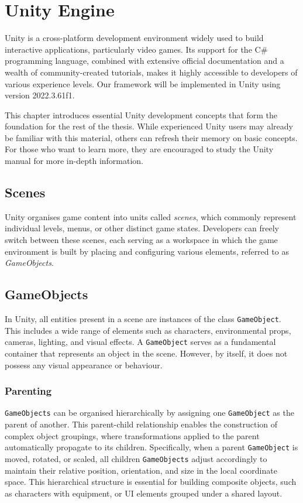 \chapter{Unity Engine}
\label{chap:refs}
Unity is a cross-platform development environment widely used to build interactive applications, particularly video games. Its support for the C\# programming language, combined with extensive official documentation and a wealth of community-created tutorials, makes it highly accessible to developers of various experience levels. Our framework will be implemented in Unity using version 2022.3.61f1. 

This chapter introduces essential Unity development concepts that form the foundation for the rest of the thesis. While experienced Unity users may already be familiar with this material, others can refresh their memory on basic concepts. For those who want to learn more, they are encouraged to study the Unity manual \cite{Unity-manual} for more in-depth information. 

\section{Scenes}
Unity organises game content into units called \textit{scenes}, which commonly represent individual levels, menus, or other distinct game states. Developers can freely switch between these scenes, each serving as a workspace in which the game environment is built by placing and configuring various elements, referred to as \textit{GameObjects}. 

\section{GameObjects}
In Unity, all entities present in a scene are instances of the class \verb|GameObject|. This includes a wide range of elements such as characters, environmental props, cameras, lighting, and visual effects. A \verb|GameObject| serves as a fundamental container that represents an object in the scene. However, by itself, it does not possess any visual appearance or behaviour.

\subsection{Parenting}
\verb|GameObjects| can be organised hierarchically by assigning one \verb|GameObject| as the parent of another. This parent-child relationship enables the construction of complex object groupings, where transformations applied to the parent automatically propagate to its children. Specifically, when a parent \verb|GameObject| is moved, rotated, or scaled, all children \verb|GameObjects| adjust accordingly to maintain their relative position, orientation, and size in the local coordinate space. This hierarchical structure is essential for building composite objects, such as characters with equipment, or UI elements grouped under a shared layout. 

